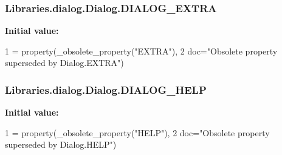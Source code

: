 \subsubsection[{\texorpdfstring{D\+I\+A\+L\+O\+G\+\_\+\+E\+X\+T\+RA}{DIALOG_EXTRA}}]{\setlength{\rightskip}{0pt plus 5cm}Libraries.\+dialog.\+Dialog.\+D\+I\+A\+L\+O\+G\+\_\+\+E\+X\+T\+RA\hspace{0.3cm}{\ttfamily [static]}}\hypertarget{class_libraries_1_1dialog_1_1_dialog_a5217fa9cf64982fc887be156fa4151c7}{}\label{class_libraries_1_1dialog_1_1_dialog_a5217fa9cf64982fc887be156fa4151c7}
{\bfseries Initial value\+:}
\begin{DoxyCode}
1 = property(\_obsolete\_property(\textcolor{stringliteral}{"EXTRA"}),
2                          doc=\textcolor{stringliteral}{"Obsolete property superseded by Dialog.EXTRA"})
\end{DoxyCode}
\subsubsection[{\texorpdfstring{D\+I\+A\+L\+O\+G\+\_\+\+H\+E\+LP}{DIALOG_HELP}}]{\setlength{\rightskip}{0pt plus 5cm}Libraries.\+dialog.\+Dialog.\+D\+I\+A\+L\+O\+G\+\_\+\+H\+E\+LP\hspace{0.3cm}{\ttfamily [static]}}\hypertarget{class_libraries_1_1dialog_1_1_dialog_aa968503996ea0ee10d61f752fabc3e0f}{}\label{class_libraries_1_1dialog_1_1_dialog_aa968503996ea0ee10d61f752fabc3e0f}
{\bfseries Initial value\+:}
\begin{DoxyCode}
1 = property(\_obsolete\_property(\textcolor{stringliteral}{"HELP"}),
2                          doc=\textcolor{stringliteral}{"Obsolete property superseded by Dialog.HELP"})
\end{DoxyCode}
